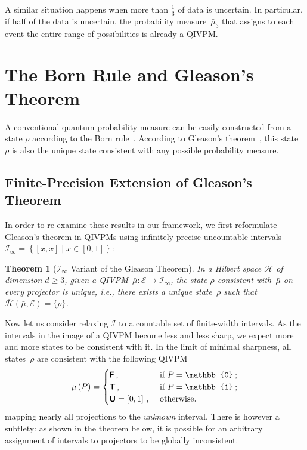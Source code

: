 \documentclass[english,reprint, aps, prl,superscriptaddress, showpacs,
showkeys, longbibliography, amsmath, amssymb, floatfix]{revtex4-1}
\theoremstyle{plain}
\newtheorem{thm}{Theorem}
\theoremstyle{definition}
\newcommand{\Hilb}{\mathcal{H}}
\newcommand{\events}{\ensuremath{\mathcal{E}}}
\newcommand{\interval}[1]{{\normalfont\textsf{\textbf{#1}}}}
\newcommand{\imposs}{\interval{F}}
\newcommand{\necess}{\interval{T}}
\newcommand{\unknown}{\interval{U}}
\newcommand{\set}[2]{\ensuremath{\left\{ {#1}\mathrel{}\middle|\mathrel{}{#2}\right\} }}
\newcommand{\coreBorn}{\ensuremath{\overline{\Hilb}}}
\begin{document}
A similar situation happens when more than $\frac{1}{3}$ of data
is uncertain. In particular, if half of the data is uncertain, the probability
measure~$\bar{\mu}_{3}$ that assigns to each event the entire range of possibilities
is already a QIVPM.

\section{The Born Rule and Gleason's Theorem}

\label{sec:Gleason}

A conventional quantum probability measure can be easily constructed
from a state $\rho$ according to the Born
rule~\cite{Born1983bibTeX,Mermin2007,Jaeger2007}.  According
to Gleason's
theorem~\cite{gleason1957,Redhead1987-REDINA,peres1995quantum}, this
state $\rho$ is also the unique state consistent with any possible
probability measure. 

{\color{red}\subsection{Finite-Precision Extension of Gleason's Theorem}}

In order to re-examine these results in our
framework, we first reformulate Gleason's theorem in QIVPMs using
infinitely precise uncountable
intervals~$\mathscr{I}_{\infty}=\set{\left[x,x\right]}{x\in\left[0,1\right]}$:

\begin{thm}[$\mathscr{I}_{\infty}$ Variant of the Gleason
  Theorem]\label{cor:Gleason's}In
  a Hilbert space $\Hilb$ of dimension $d\geq3$, given a
  QIVPM~$\bar{\mu}:\events\rightarrow\mathscr{I}_{\infty}$, the state
  $\rho$ consistent with~$\bar{\mu}$ on every projector
  is unique, i.e., there exists a
  unique state~$\rho$ such that
  $\coreBorn\left(\bar{\mu},\events\right)=\{\rho\}$.
  \end{thm}

Now let us consider relaxing $\mathscr{I}$
to a countable set of finite-width intervals.
As the intervals in the image of a QIVPM become less and less sharp,
we expect more and more states to be consistent with it. In
the limit of minimal sharpness, all states~$\rho$
are consistent with the following QIVPM
\begin{equation}
\bar{\mu}\left(P\right)=\begin{cases}
\imposs\,, & \textrm{ if }P=\mathbb{0}\:;\\
\necess\,, & \textrm{ if }P=\mathbb{1}\:;\\
\unknown=\left[0,1\right]\,, & \textrm{ otherwise.}
\end{cases}
\end{equation}
mapping nearly all
projections to the {\color{red}\emph{unknown}} interval. There is however a
subtlety: as shown in
the theorem below, it is possible for an arbitrary assignment of intervals to projectors
to be globally inconsistent.
\end{document}
